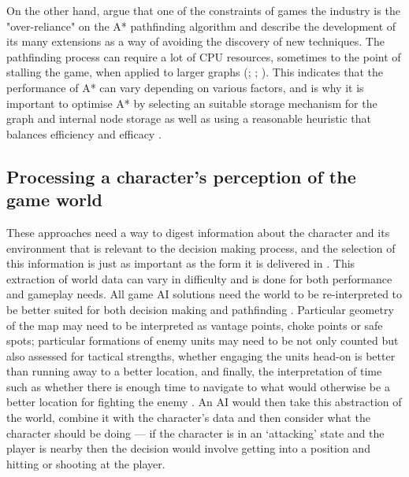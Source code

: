 \documentclass[11pt, a4paper]{report}
\begin{document}
On the other hand, \citeauthor{graham2003pathfinding} \parencite*[68]{graham2003pathfinding} argue that one of the constraints of games the industry is the "over-reliance" on the A* pathfinding algorithm and describe the development of its many extensions as a way of avoiding the discovery of new techniques. The pathfinding process can require a lot of CPU resources, sometimes to the point of stalling the game, when applied to larger graphs (\cite[127]{cui2011based}; \cite[110]{stentz1996map}; \cite[67]{graham2003pathfinding}). This indicates that the performance of A* can vary depending on various factors, and is why it is important to optimise A* by selecting an suitable storage mechanism for the graph and internal node storage as well as using a reasonable heuristic that balances efficiency and efficacy \parencite[228]{millington2019ai}.

\subsection{Processing a character's perception of the game world}
\label{subsec:processingACharactersPerception}

These approaches need a way to digest information about the character and its environment that is relevant to the decision making process, and the selection of this information is just as important as the form it is delivered in \parencite[126]{cui2011based}. This extraction of world data can vary in difficulty \parencite[3]{diller2004behavior} and is done for both performance and gameplay needs. All game AI solutions need the world to be re-interpreted to be better suited for both decision making \parencite[2]{buro2004call} and pathfinding \parencite[3]{diller2004behavior}. Particular geometry of the map may need to be interpreted as vantage points, choke points or safe spots; particular formations of enemy units may need to be not only counted but also assessed for tactical strengths, whether engaging the units head-on is better than running away to a better location, and finally, the interpretation of time such as whether there is enough time to navigate to what would otherwise be a better location for fighting the enemy \parencite{buro2004call}. An AI would then take this abstraction of the world, combine it with the character's data and then consider what the character should be doing --- if the character is in an `attacking' state and the player is nearby then the decision would involve getting into a position and hitting or shooting at the player. 
\end{document}
